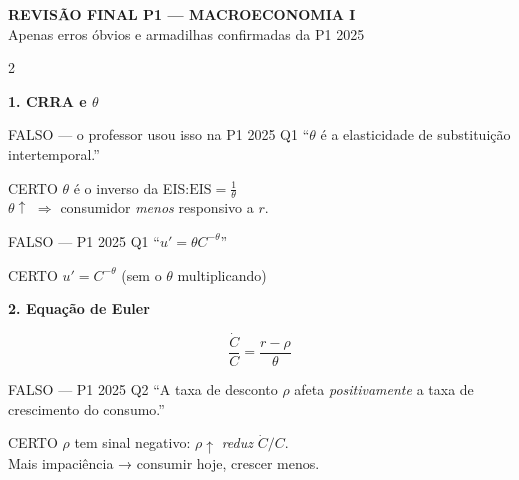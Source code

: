 \documentclass[10pt, a4paper]{article}
\begin{document}
\begin{center}
{\large\bfseries\color{azul} REVISÃO FINAL P1 — MACROECONOMIA I}\\
{\small\color{cinza} Apenas erros óbvios e armadilhas confirmadas da P1 2025}
\end{center}

\vspace{0.3em}
\begin{multicols}{2}

\textbf{\color{azul}\large 1. CRRA e $\theta$}

\begin{errobox}{FALSO — o professor usou isso na P1 2025 Q1}
``$\theta$ é a elasticidade de substituição intertemporal.''
\end{errobox}
\vspace{0.3em}
\begin{certobox}{CERTO}
$\theta$ é o inverso da EIS:\quad $\displaystyle\text{EIS} = \frac{1}{\theta}$\\
$\theta\uparrow$ $\Rightarrow$ consumidor \emph{menos} responsivo a $r$.
\end{certobox}

\begin{errobox}{FALSO — P1 2025 Q1}
``$u' = \theta C^{-\theta}$''
\end{errobox}
\vspace{0.3em}
\begin{certobox}{CERTO}
$u' = C^{-\theta}$ \quad(sem o $\theta$ multiplicando)
\end{certobox}

\vspace{0.5em}
\textbf{\color{azul}\large 2. Equação de Euler}

\begin{formulabox}
\[\frac{\dot C}{C} = \frac{r - \rho}{\theta}\]
\end{formulabox}

\begin{errobox}{FALSO — P1 2025 Q2}
``A taxa de desconto $\rho$ afeta \emph{positivamente} a taxa de crescimento do consumo.''
\end{errobox}
\vspace{0.3em}
\begin{certobox}{CERTO}
$\rho$ tem sinal negativo: $\rho\uparrow$ \emph{reduz} $\dot C/C$.\\
Mais impaciência → consumir hoje, crescer menos.
\end{certobox}


\end{multicols}
\end{document}
